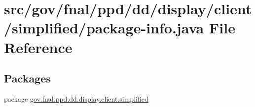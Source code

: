 \hypertarget{gov_2fnal_2ppd_2dd_2display_2client_2simplified_2package-info_8java}{\section{src/gov/fnal/ppd/dd/display/client/simplified/package-\/info.java File Reference}
\label{gov_2fnal_2ppd_2dd_2display_2client_2simplified_2package-info_8java}
}
\subsection*{Packages}
\begin{DoxyCompactItemize}
\item 
package \hyperlink{namespacegov_1_1fnal_1_1ppd_1_1dd_1_1display_1_1client_1_1simplified}{gov.\-fnal.\-ppd.\-dd.\-display.\-client.\-simplified}
\end{DoxyCompactItemize}
